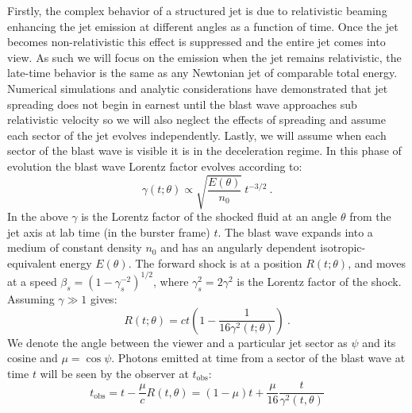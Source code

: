 \documentclass[modern]{aastex62}
\newcommand{\tobs}{\ensuremath{t_{\mathrm{obs}}}}
\begin{document}
  Firstly, the complex behavior of a structured jet is due to relativistic beaming enhancing the jet emission at different angles as a function of time.  Once the jet becomes non-relativistic this effect is suppressed and the entire jet comes into view.  As such we will focus on the emission when the jet remains relativistic, the late-time behavior is the same as any Newtonian jet of comparable total energy.  Numerical simulations and analytic considerations have demonstrated that jet spreading does not begin in earnest until the blast wave approaches sub relativistic velocity so we will also neglect the effects of spreading and assume each sector of the jet evolves independently.  Lastly, we will assume when each sector of the blast wave is visible it is in the deceleration regime.  In this phase of evolution the blast wave Lorentz factor evolves according to:
  \begin{equation}
	\gamma(t; \theta) \propto \sqrt{\frac{E(\theta)}{n_0}}\ t^{-3/2}\ . \label{eq:lorentzEvolution}
\end{equation}
  In the above $\gamma$ is the Lorentz factor of the shocked fluid at an angle $\theta$ from the jet axis at lab time (in the burster frame) $t$.  The blast wave expands into a medium of constant density $n_0$ and has an angularly dependent isotropic-equivalent energy $E(\theta)$.  The forward shock is at a position $R(t; \theta)$, and moves at a speed $\beta_s = (1-\gamma_s^{-2})^{1/2}$, where $\gamma_s^2 = 2 \gamma^2$ is the Lorentz factor of the shock.  Assuming $\gamma \gg 1$ gives:
\begin{equation}
	R(t; \theta) = ct\left(1-\frac{1}{16 \gamma^2(t; \theta)}\right)\ .
\end{equation}
We denote the angle between the viewer and a particular jet sector as $\psi$ and its cosine and $\mu = \cos \psi$.  Photons emitted at time from a sector of the blast wave at time $t$ will be seen by the observer at $\tobs$:
\begin{equation}
	\tobs = t - \frac{\mu}{c} R(t,\theta) = (1-\mu)t + \frac{\mu}{16}\frac{t}{ \gamma^2(t,\theta)} \label{eq:tobs}
\end{equation}
\end{document}
